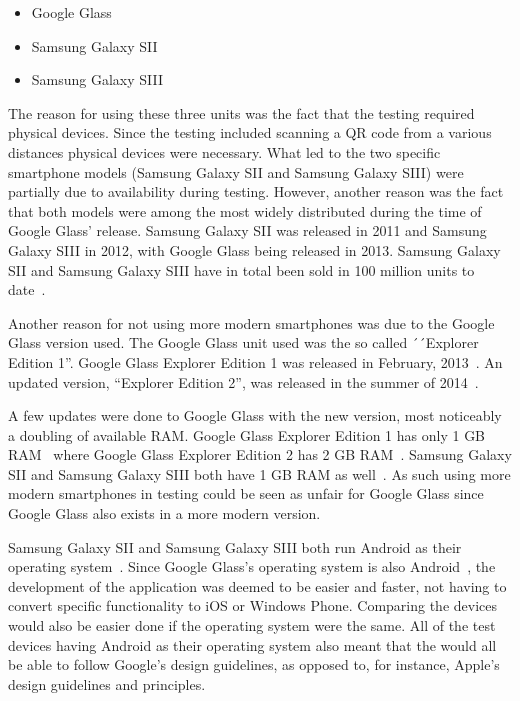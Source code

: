 \begin{itemize}
	\item Google Glass
	\item Samsung Galaxy SII
	\item Samsung Galaxy SIII
\end{itemize}

The reason for using these three units was the fact that the testing required physical devices. Since the testing included scanning a QR code from a various distances physical devices were necessary. What led to the two specific smartphone models (Samsung Galaxy SII and Samsung Galaxy SIII) were partially due to availability during testing. However, another reason was the fact that both models were among the most widely distributed during the time of Google Glass' release. Samsung Galaxy SII was released in 2011 and Samsung Galaxy SIII in 2012, with Google Glass being released in 2013. Samsung Galaxy SII and Samsung Galaxy SIII have in total been sold in 100 million units to date~\cite{samsungGalaxyS2Sales, samsungGalaxyS3Sales}.

Another reason for not using more modern smartphones was due to the Google Glass version used. The Google Glass unit used was the so called ´´Explorer Edition 1''. Google Glass Explorer Edition 1 was released in February, 2013~\cite{historyOfGlass}. An updated version, ``Explorer Edition 2'', was released in the summer of 2014~\cite{googleGlassEdition2RAM}. 

A few updates were done to Google Glass with the new version, most noticeably a doubling of available RAM. Google Glass Explorer Edition 1 has only 1 GB RAM~\cite{googleGlassEdition1RAM} where Google Glass Explorer Edition 2 has 2 GB RAM~\cite{googleGlassEdition2RAM}. Samsung Galaxy SII and Samsung Galaxy SIII both have 1 GB RAM as well~\cite{samsungGalaxyS2Wiki, samsungGalaxyS3Wiki}. As such using more modern smartphones in testing could be seen as unfair for Google Glass since Google Glass also exists in a more modern version.

Samsung Galaxy SII and Samsung Galaxy SIII both run Android as their operating system~\cite{samsungGalaxyS2Wiki, samsungGalaxyS3Wiki}. Since Google Glass's operating system is also Android~\cite{googleGlassWiki}, the development of the application was deemed to be easier and faster, not having to convert specific functionality to iOS or Windows Phone. Comparing the devices would also be easier done if the operating system were the same. All of the test devices having Android as their operating system also meant that the would all be able to follow Google's design guidelines, as opposed to, for instance, Apple's design guidelines and principles\cite{iosDesignGuidelines}.

